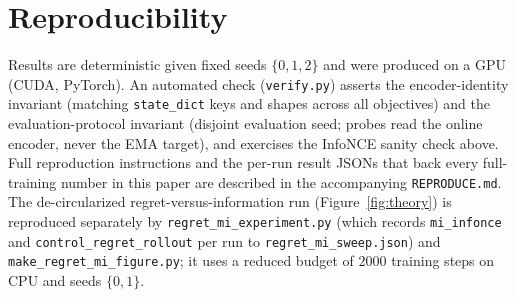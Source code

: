 \documentclass[11pt]{article}
\begin{document}




\section{Reproducibility}
\label{app:repro}
Results are deterministic given fixed seeds $\{0,1,2\}$ and were produced on a GPU
(CUDA, PyTorch). An automated check (\texttt{verify.py}) asserts the encoder-identity invariant
(matching \texttt{state\_dict} keys and shapes across all objectives) and the evaluation-protocol
invariant (disjoint evaluation seed; probes read the online encoder, never the EMA target), and
exercises the InfoNCE sanity check above. Full reproduction instructions and the per-run result
JSONs that back every full-training number in this paper are described in the accompanying
\texttt{REPRODUCE.md}. The de-circularized regret-versus-information run (Figure~\ref{fig:theory})
is reproduced separately by \texttt{regret\_mi\_experiment.py} (which records \texttt{mi\_infonce}
and \texttt{control\_regret\_rollout} per run to \texttt{regret\_mi\_sweep.json}) and
\texttt{make\_regret\_mi\_figure.py}; it uses a reduced budget of $2000$ training steps on CPU and
seeds $\{0,1\}$.



\end{document}
